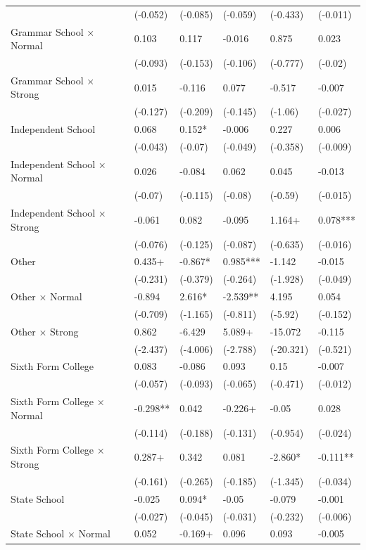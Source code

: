 \begin{longtable}{llllll}
 & (-0.052) & (-0.085) & (-0.059) & (-0.433) & (-0.011) \\
Grammar School × Normal & 0.103 & 0.117 & -0.016 & 0.875 & 0.023 \\
 & (-0.093) & (-0.153) & (-0.106) & (-0.777) & (-0.02) \\
Grammar School × Strong & 0.015 & -0.116 & 0.077 & -0.517 & -0.007 \\
 & (-0.127) & (-0.209) & (-0.145) & (-1.06) & (-0.027) \\
Independent School & 0.068 & 0.152* & -0.006 & 0.227 & 0.006 \\
 & (-0.043) & (-0.07) & (-0.049) & (-0.358) & (-0.009) \\
Independent School × Normal & 0.026 & -0.084 & 0.062 & 0.045 & -0.013 \\
 & (-0.07) & (-0.115) & (-0.08) & (-0.59) & (-0.015) \\
Independent School × Strong & -0.061 & 0.082 & -0.095 & 1.164+ & 0.078*** \\
 & (-0.076) & (-0.125) & (-0.087) & (-0.635) & (-0.016) \\
Other & 0.435+ & -0.867* & 0.985*** & -1.142 & -0.015 \\
 & (-0.231) & (-0.379) & (-0.264) & (-1.928) & (-0.049) \\
Other × Normal & -0.894 & 2.616* & -2.539** & 4.195 & 0.054 \\
 & (-0.709) & (-1.165) & (-0.811) & (-5.92) & (-0.152) \\
Other × Strong & 0.862 & -6.429 & 5.089+ & -15.072 & -0.115 \\
 & (-2.437) & (-4.006) & (-2.788) & (-20.321) & (-0.521) \\
Sixth Form College & 0.083 & -0.086 & 0.093 & 0.15 & -0.007 \\
 & (-0.057) & (-0.093) & (-0.065) & (-0.471) & (-0.012) \\
Sixth Form College × Normal & -0.298** & 0.042 & -0.226+ & -0.05 & 0.028 \\
 & (-0.114) & (-0.188) & (-0.131) & (-0.954) & (-0.024) \\
Sixth Form College × Strong & 0.287+ & 0.342 & 0.081 & -2.860* & -0.111** \\
 & (-0.161) & (-0.265) & (-0.185) & (-1.345) & (-0.034) \\
State School & -0.025 & 0.094* & -0.05 & -0.079 & -0.001 \\
 & (-0.027) & (-0.045) & (-0.031) & (-0.232) & (-0.006) \\
State School × Normal & 0.052 & -0.169+ & 0.096 & 0.093 & -0.005 \\

\end{longtable}
